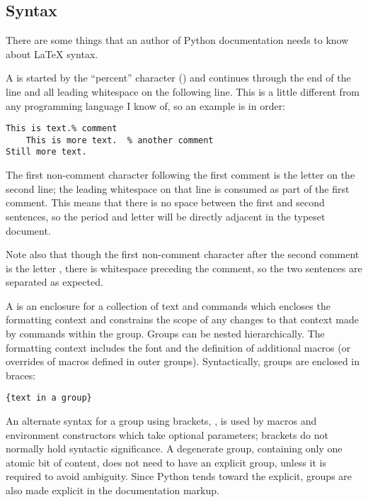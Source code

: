 \documentclass{howto}
\begin{document}
  \subsection{Syntax}

    There are some things that an author of Python documentation needs
    to know about \LaTeX{} syntax.

    A  is started by the ``percent'' character
    (\character{\%}) and continues through the end of the line and all
    leading whitespace on the following line.  This is a little
    different from any programming language I know of, so an example
    is in order:

\begin{verbatim}
This is text.% comment
    This is more text.  % another comment
Still more text.
\end{verbatim}

    The first non-comment character following the first comment is the
    letter  on the second line; the leading whitespace on
    that line is consumed as part of the first comment.  This means
    that there is no space between the first and second sentences, so
    the period and letter  will be directly adjacent in
    the typeset document.

    Note also that though the first non-comment character after the
    second comment is the letter , there is whitespace
    preceding the comment, so the two sentences are separated as
    expected.

    A  is an enclosure for a collection of text and
    commands which encloses the formatting context and constrains the
    scope of any changes to that context made by commands within the
    group.  Groups can be nested hierarchically.  The formatting
    context includes the font and the definition of additional macros
    (or overrides of macros defined in outer groups).  Syntactically,
    groups are enclosed in braces:

\begin{verbatim}
{text in a group}
\end{verbatim}

    An alternate syntax for a group using brackets, \code{[...]}, is
    used by macros and environment constructors which take optional
    parameters; brackets do not normally hold syntactic significance.
    A degenerate group, containing only one atomic bit of content,
    does not need to have an explicit group, unless it is required to
    avoid ambiguity.  Since Python tends toward the explicit, groups
    are also made explicit in the documentation markup.
\end{document}
